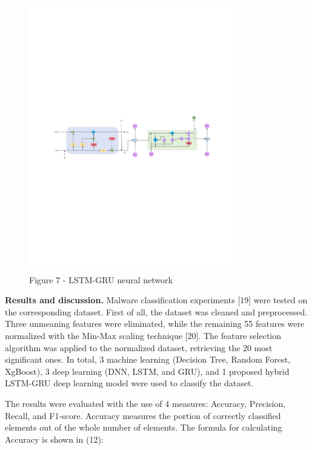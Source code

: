 \begin{figure}[H]
	\centering
	\includegraphics[width=0.8\textwidth]{media/ict/image80}
	\caption*{Figure 7 - LSTM-GRU neural network}
\end{figure}

{\bfseries Results and discussion.} Malware classification experiments
{[}19{]} were tested on the corresponding dataset. First of all, the
dataset was cleaned and preprocessed. Three unmeaning features were
eliminated, while the remaining 55 features were normalized with the
Min-Max scaling technique {[}20{]}. The feature selection algorithm was
applied to the normalized dataset, retrieving the 20 most significant
ones. In total, 3 machine learning (Decision Tree, Random Forest,
XgBoost), 3 deep learning (DNN, LSTM, and GRU), and 1 proposed hybrid
LSTM-GRU deep learning model were used to classify the dataset.

The results were evaluated with the use of 4 measures: Accuracy,
Precision, Recall, and F1-score. Accuracy measures the portion of
correctly classified elements out of the whole number of elements. The
formula for calculating Accuracy is shown in (12):

